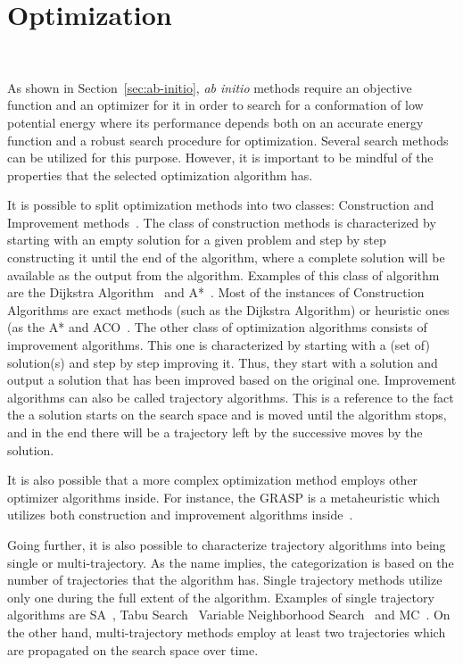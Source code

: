\section{Optimization}~\label{sec:bioinspired}

As shown in Section~\ref{sec:ab-initio}, \textit{ab initio} methods require an objective function and an optimizer for it in order to search for a conformation of low potential energy where its performance depends both on an accurate energy function and a robust search procedure for optimization. Several search methods can be utilized for this purpose. However, it is important to be mindful of the properties that the selected optimization algorithm has.

It is possible to split optimization methods into two classes: Construction and Improvement methods~\cite{russell2016artificial}. The class of construction methods is characterized by starting with an empty solution for a given problem and step by step constructing it until the end of the algorithm, where a complete solution will be available as the output from the algorithm. Examples of this class of algorithm are the Dijkstra Algorithm~\cite{dijkstra1959dijkstra} and A*~\cite{hart1968formal}. Most of the instances of Construction Algorithms are exact methods (such as the Dijkstra Algorithm) or heuristic ones (as the A* and \ac{ACO}~\cite{dorigo1999ant}.
The other class of optimization algorithms consists of improvement algorithms. This one is characterized by starting with a (set of) solution(s) and step by step improving it. Thus, they start with a solution and output a solution that has been improved based on the original one. Improvement algorithms can also be called trajectory algorithms. This is a reference to the fact the a solution starts on the search space and is moved until the algorithm stops, and in the end there will be a trajectory left by the successive moves by the solution.

It is also possible that a more complex optimization method employs other optimizer algorithms inside. For instance, the \ac{GRASP} is a metaheuristic which utilizes both construction and improvement algorithms inside~\cite{feo1995greedy}. %

Going further, it is also possible to characterize trajectory algorithms into being single or multi-trajectory. As the name implies, the categorization is based on the number of trajectories that the algorithm has. Single trajectory methods utilize only one during the full extent of the algorithm. Examples of single trajectory algorithms are \ac{SA}~\cite{kirkpatrick1983optimization}, Tabu Search~\cite{glover1998tabu} Variable Neighborhood Search~\cite{mladenovic1997variable} and \ac{MC}~\cite{hastings1970monte}. On the other hand, multi-trajectory methods employ at least two trajectories which are propagated on the search space over time. 

